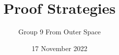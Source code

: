 \documentclass{beamer}
\title{Proof Strategies}
\author{Group 9 From Outer Space}
\date{17 November 2022}
\begin{document}
\begin{frame}
  \titlepage
\end{frame}





\end{document}
